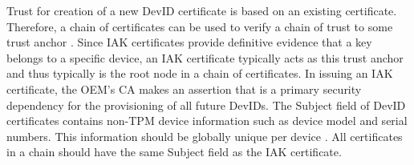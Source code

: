 Trust for creation of a new DevID certificate is based on an existing certificate. Therefore, a chain of certificates can be used to verify a chain of trust to some trust anchor \cite{DevIDSpec-TCG}. Since IAK certificates provide definitive evidence that a key belongs to a specific device, an IAK certificate typically acts as this trust anchor and thus typically is the root node in a chain of certificates. In issuing an IAK certificate, the OEM's CA makes an assertion that is a primary security dependency for the provisioning of all future DevIDs. 
The Subject field of DevID certificates contains non-TPM device information such as device model and serial numbers. This information should be globally unique per device \cite{DevIDSpec-IEEE}. All certificates in a chain should have the same Subject field as the IAK certificate.










